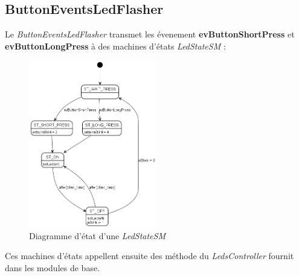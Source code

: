 \subsection{ButtonEventsLedFlasher}
Le \emph{ButtonEventsLedFlasher} transmet les évenement \textbf{evButtonShortPress} et 
\textbf{evButtonLongPress} à des machines d'états \emph{LedStateSM} :
\begin{figure}[H]
    \centering
    \includegraphics[width=0.5\textwidth]{Images/buttons/LedsStateSM.png}
    \caption[Full UML]{Diagramme d'état d'une \emph{LedStateSM}}
\end{figure}
Ces machines d'états appellent ensuite des méthode du \emph{LedsController} fournit
dans les modules de base.